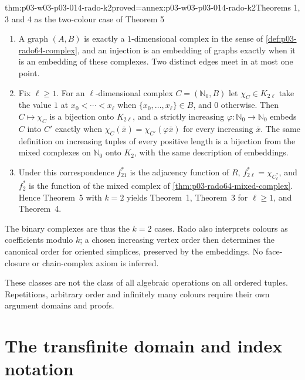\begin{hbtheorem}{thm:p03-w03-p03-014-rado-k2}{proved=annex:p03-w03-p03-014-rado-k2}{Theorems 1, 3 and 4 as the two-colour case of Theorem 5}
\begin{enumerate}
\item A graph \((A,B)\) is exactly a \(1\)-dimensional complex in the
      sense of \cref{def:p03-rado64-complex}, and an injection is an
      embedding of graphs exactly when it is an embedding of these
      complexes. Two distinct edges meet in at most one point.
\item Fix \(\ell\geq1\). For an \(\ell\)-dimensional complex
      \(C=(\mathbb N_0,B)\) let \(\chi_C\in K_{2\ell}\) take the value
      \(1\) at \(x_0<\cdots<x_\ell\) when
      \(\{x_0,\ldots,x_\ell\}\in B\), and \(0\) otherwise. Then
      \(C\mapsto\chi_C\) is a bijection onto \(K_{2\ell}\), and a strictly
      increasing \(\varphi:\mathbb N_0\to\mathbb N_0\) embeds \(C\) into
      \(C'\) exactly when \(\chi_C(\bar x)=\chi_{C'}(\varphi\bar x)\) for
      every increasing \(\bar x\). The same definition on increasing tuples
      of every positive length is a bijection from the mixed complexes on
      \(\mathbb N_0\) onto \(K_2\), with the same description of embeddings.
\item Under this correspondence \(f^*_{21}\) is the adjacency function of
      \(R\), \(f^*_{2\ell}=\chi_{C^*_\ell}\), and \(f^*_2\) is the
      function of the mixed complex of \cref{thm:p03-rado64-mixed-complex}.
      Hence Theorem~5 with \(k=2\) yields Theorem~1, Theorem~3 for
      \(\ell\geq1\), and Theorem~4.
\end{enumerate}
\end{hbtheorem}

The binary complexes are thus the \(k=2\) cases. Rado also interprets colours as
coefficients modulo \(k\); a chosen increasing vertex order then determines
the canonical order for oriented simplices, preserved by the embeddings.
No face-closure or chain-complex axiom is inferred.

These classes are not the class of all algebraic operations on all ordered
tuples. Repetitions, arbitrary order and infinitely many colours require
their own argument domains and proofs.

\section{The transfinite domain and index notation}
\label{sec:p03-rado64-transfinite-data}


